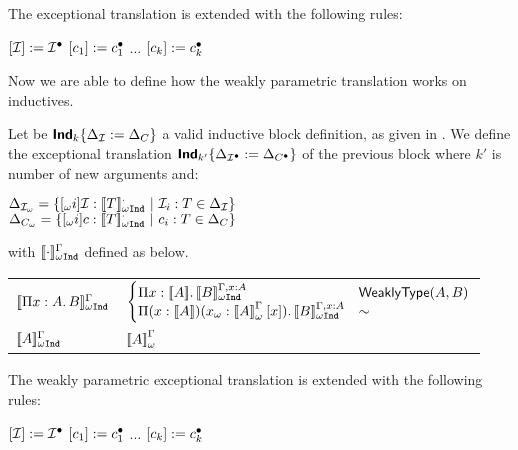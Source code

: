 \begin{Definition}
\noindent The exceptional translation is extended with the following rules:
\begin{center}
$[\mathcal{I}]:=\mathcal{I}^{\bullet}$ \hspace{1em}
$[c_{1}]:=c_{1}^{\bullet}$ \hspace{1em}
$\dots$ \hspace{1em}
$[c_{k}]:=c_{k}^{\bullet}$
\end{center}
\end{Definition}

Now we are able to define how the weakly parametric translation works on inductives.

\begin{Definition}
\label{def:WInductiveDef}
Let be $\IndIntro[k][\varContext_\IndD][\varContext_C]$ a valid inductive block
definition, as given in . 
We define the exceptional translation 
$\IndIntro[k'][\varContext_{\ConstructorTrans{\IndD}}][\varContext_{\ConstructorTrans{C}}]$
of the previous block where $k'$ is number of new arguments and:
\begin{center}
$\varContext_{\WTermTrans{\IndD}} 
=
\{\WTermTrans[i]{\IndD}: \WIndArgTrans[\cdot]{T} \ |\ \typing{\IndD_i}{T} \in \varContext_\IndD\}
$ \\
$\varContext_{\WTermTrans{C}} 
=
\{\WTermTrans[i]{c}: \WIndArgTrans[\cdot]{T} \ |\ \typing{c_i}{T} \in \varContext_C\}
$
\end{center}
with $\WIndArgTrans{\cdot}$ defined as below.

{\renewcommand{\arraystretch}{1.15}
\begin{tabular}{l@{$\hspace{0.2em}\termDef$\ \ }l}
$\WIndArgTrans{\depArrow{x}{A}{B}}$ & 
        $\left \{\begin{matrix*}[l]
        \depArrow{x}{\TypeTrans{A}}{\WIndArgTrans[\Context,\typing{x}{A}]{B}} & \weaklypropFun[A,B]\\
        \depArrow{x}{\TypeTrans{A}}{
                  \WTermTrans{x}}{\app{\WParamTypeTrans{A}}{\Trans{x}}}{
                  \WIndArgTrans[\Context,\typing{x}{A}]{B}} & \otherwise
        \end{matrix*}\right .$ \\
$\WIndArgTrans{A}$ & $\WParamTypeTrans{A}$
\end{tabular}
}

\noindent The weakly parametric exceptional translation is extended with the following rules:
\begin{center}
$[\mathcal{I}]:=\mathcal{I}^{\bullet}$ \hspace{1em}
$[c_{1}]:=c_{1}^{\bullet}$ \hspace{1em}
$\dots$ \hspace{1em}
$[c_{k}]:=c_{k}^{\bullet}$
\end{center}
\end{Definition}

